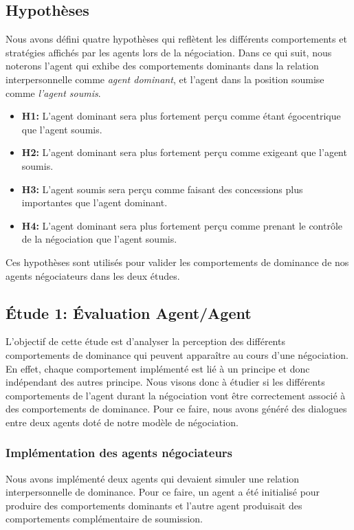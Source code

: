 		\subsection{Hypothèses}
				
				Nous avons défini quatre hypothèses qui reflètent les différents comportements et stratégies affichés par les agents lors de la négociation. Dans ce qui suit, nous noterons l'agent qui exhibe des comportements dominants dans la relation interpersonnelle comme \emph{agent dominant}, et l'agent dans la position soumise comme \emph{l'agent soumis}.
				
				\begin{itemize}
					\item \textbf {H1:} L'agent dominant sera plus fortement perçu comme étant égocentrique que l'agent soumis.
					
					\item \textbf {H2:} L'agent dominant sera plus fortement perçu comme exigeant que l'agent soumis.
					
					\item \textbf {H3:} L'agent soumis sera perçu comme faisant des concessions plus importantes que l'agent dominant.
					
					\item \textbf {H4:} L'agent dominant sera plus fortement perçu comme prenant le contrôle de la négociation que l'agent soumis.
					
				\end{itemize}
				
				Ces hypothèses sont utilisés pour valider les comportements de dominance de nos agents négociateurs dans les deux études. 
				
		\subsection{Étude 1: Évaluation Agent/Agent}
				L'objectif de cette étude est d'analyser la perception des différents comportements de dominance qui peuvent apparaître au cours d'une négociation. En effet, chaque comportement implémenté est lié à un principe et donc indépendant des autres principe. Nous visons donc à étudier si les différents comportements de l'agent durant la négociation vont être correctement associé à des comportements de dominance. Pour ce faire, nous avons généré des dialogues entre deux agents doté de notre modèle de négociation. 
			
			\subsubsection{Implémentation des agents négociateurs}
				Nous avons implémenté deux agents qui devaient simuler une relation interpersonnelle de dominance. Pour ce faire, un agent a été initialisé pour produire des comportements dominants et l'autre agent produisait des comportements complémentaire de soumission. 
				
